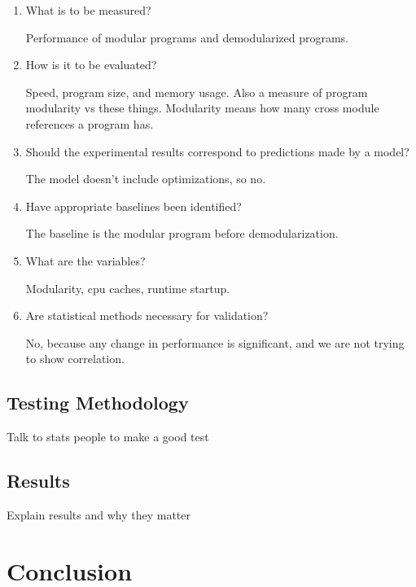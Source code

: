 \documentclass{llncs}
\begin{document}
   \begin{enumerate}

   \item What is to be measured?
   
   Performance of modular programs and demodularized programs.
  
   \item How is it to be evaluated?
   
   Speed, program size, and memory usage. Also a measure of program modularity vs these things. Modularity means how many cross module references a program has.

   \item Should the experimental results correspond to predictions made by a model?
 
   The model doesn't include optimizations, so no.

   \item Have appropriate baselines been identified?

   The baseline is the modular program before demodularization.

   \item What are the variables?

   Modularity, cpu caches, runtime startup.

   \item Are statistical methods necessary for validation?

   No, because any change in performance is significant, and we are not trying to show correlation.

   \end{enumerate}


   \subsection{Testing Methodology}

   Talk to stats people to make a good test
   
   \subsection{Results}

   Explain results and why they matter

\section{Conclusion}
\end{document}
